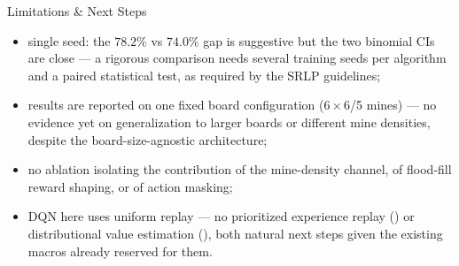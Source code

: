 \begin{frame}{Limitations \& Next Steps}
  \begin{itemize}
    \item \alert{single seed}: the $78.2\%$ vs $74.0\%$ gap is suggestive
      but the two binomial CIs are close — a rigorous comparison needs
      several training seeds per algorithm and a paired statistical test,
      as required by the SRLP guidelines;
    \item results are reported on \alert{one} fixed board configuration
      ($6\times6$/5 mines) — no evidence yet on generalization to larger
      boards or different mine densities, despite the board-size-agnostic
      architecture;
    \item no ablation isolating the contribution of the mine-density
      channel, of flood-fill reward shaping, or of action masking;
    \item DQN here uses uniform replay — no prioritized experience replay
      (\per{}) or distributional value estimation (\ddqn{}), both natural
      next steps given the existing macros already reserved for them.
  \end{itemize}
\end{frame}
